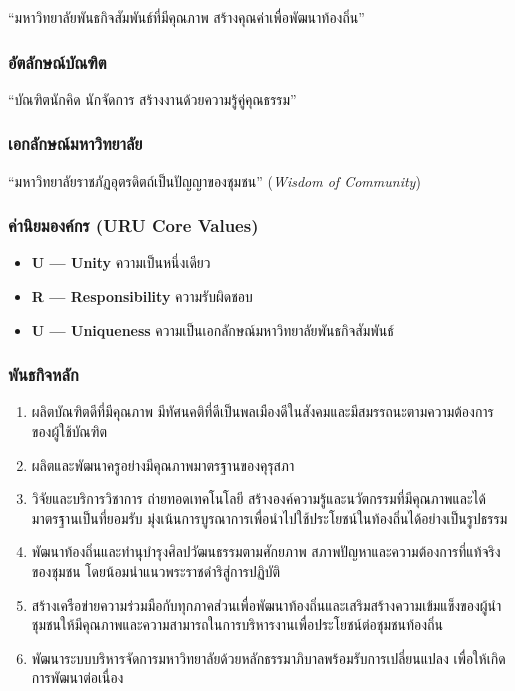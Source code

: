 ``มหาวิทยาลัยพันธกิจสัมพันธ์ที่มีคุณภาพ สร้างคุณค่าเพื่อพัฒนาท้องถิ่น''

\subsubsection*{อัตลักษณ์บัณฑิต}

``บัณฑิตนักคิด นักจัดการ สร้างงานด้วยความรู้คู่คุณธรรม''

\subsubsection*{เอกลักษณ์มหาวิทยาลัย}

``มหาวิทยาลัยราชภัฏอุตรดิตถ์เป็นปัญญาของชุมชน'' (\textit{Wisdom of Community})

\subsubsection*{ค่านิยมองค์กร (URU Core Values)}

\begin{itemize}
  \item \textbf{U --- Unity} ความเป็นหนึ่งเดียว
  \item \textbf{R --- Responsibility} ความรับผิดชอบ
  \item \textbf{U --- Uniqueness} ความเป็นเอกลักษณ์มหาวิทยาลัยพันธกิจสัมพันธ์
\end{itemize}

\subsubsection*{พันธกิจหลัก}

\begin{enumerate}
  \item ผลิตบัณฑิตดีที่มีคุณภาพ มีทัศนคติที่ดีเป็นพลเมืองดีในสังคมและมีสมรรถนะตามความต้องการของผู้ใช้บัณฑิต
  \item ผลิตและพัฒนาครูอย่างมีคุณภาพมาตรฐานของคุรุสภา
  \item วิจัยและบริการวิชาการ ถ่ายทอดเทคโนโลยี สร้างองค์ความรู้และนวัตกรรมที่มีคุณภาพและได้มาตรฐานเป็นที่ยอมรับ มุ่งเน้นการบูรณาการเพื่อนำไปใช้ประโยชน์ในท้องถิ่นได้อย่างเป็นรูปธรรม
  \item พัฒนาท้องถิ่นและทำนุบำรุงศิลปวัฒนธรรมตามศักยภาพ สภาพปัญหาและความต้องการที่แท้จริงของชุมชน โดยน้อมนำแนวพระราชดำริสู่การปฏิบัติ
  \item สร้างเครือข่ายความร่วมมือกับทุกภาคส่วนเพื่อพัฒนาท้องถิ่นและเสริมสร้างความเข้มแข็งของผู้นำชุมชนให้มีคุณภาพและความสามารถในการบริหารงานเพื่อประโยชน์ต่อชุมชนท้องถิ่น
  \item พัฒนาระบบบริหารจัดการมหาวิทยาลัยด้วยหลักธรรมาภิบาลพร้อมรับการเปลี่ยนแปลง เพื่อให้เกิดการพัฒนาต่อเนื่อง
\end{enumerate}

